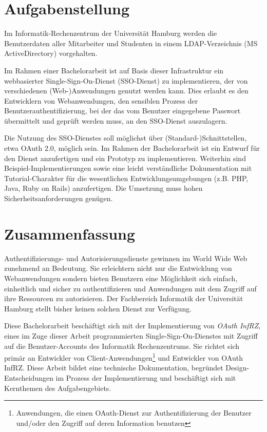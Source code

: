 \documentclass[12pt,a4paper,pointednumbers,abstracton]{scrartcl}
\newcommand{\changefont}[3]{
\fontfamily{#1} \fontseries{#2} \fontshape{#3} \selectfont}
\newcommand{\blankpage}{
\newpage
\thispagestyle{empty}
\null
\vfill
\begin{center}
	This page is intentionally left blank.
\end{center}
\newpage
}
\begin{document}
\normalsize
\changefont{ppl}{m}{n}
\newpage
\setcounter{page}{1}
\section*{Aufgabenstellung}

Im Informatik-Rechenzentrum der Universität Hamburg werden die Benutzerdaten aller Mitarbeiter und Studenten in einem LDAP-Verzeichnis (MS ActiveDirectory) vorgehalten.

Im Rahmen einer Bachelorarbeit ist auf Basis dieser Infrastruktur ein webbasierter Single-Sign-On-Dienst (SSO-Dienst) zu implementieren, der von verschiedenen \mbox{(Web-)Anwendungen} genutzt werden kann. Dies erlaubt es den Entwicklern von Webanwendungen, den sensiblen Prozess der Benutzerauthentifizierung, bei der das vom Benutzer eingegebene Passwort übermittelt und geprüft werden muss, an den SSO-Dienst auszulagern.

Die Nutzung des SSO-Dienstes soll möglichst über (Standard-)Schnittstellen, etwa OAuth 2.0, möglich sein. Im Rahmen der Bachelorarbeit ist ein Entwurf für den Dienst anzufertigen und ein Prototyp zu implementieren. Weiterhin sind Beispiel-Implementierungen sowie eine leicht verständliche Dokumentation mit Tutorial-Charakter für die wesentlichen Entwicklungsumgebungen (z.B. PHP, Java, Ruby on Rails) anzufertigen. Die Umsetzung muss hohen Sicherheitsanforderungen genügen.

\newpage
\section*{Zusammenfassung}

Authentifizierungs- und Autorisierungsdienste gewinnen im World Wide Web zunehmend an Bedeutung.
Sie erleichtern nicht nur die Entwicklung von Webanwendungen sondern bieten Benutzern eine Möglichkeit sich einfach, einheitlich und sicher zu authentifizieren und Anwendungen mit dem Zugriff auf ihre Ressourcen zu autorisieren.
Der Fachbereich Informatik der Universität Hamburg stellt bisher keinen solchen Dienst zur Verfügung.

Diese Bachelorarbeit beschäftigt sich mit der Implementierung von \emph{OAuth InfRZ}, eines im Zuge dieser Arbeit programmierten Single-Sign-On-Dienstes mit Zugriff auf die Benutzer-Accounts des Informatik Rechenzentrums.
Sie richtet sich primär an Entwickler von Client-Anwendungen\footnote{Anwendungen, die einen OAuth-Dienst zur Authentifizierung der Benutzer und/oder den Zugriff auf deren Information benutzen} und Entwickler von OAuth InfRZ.
Diese Arbeit bildet eine technische Dokumentation, begründet Design-Entscheidungen im Prozess der Implementierung und beschäftigt sich mit Kernthemen des Aufgabengebiets.
\end{document}

